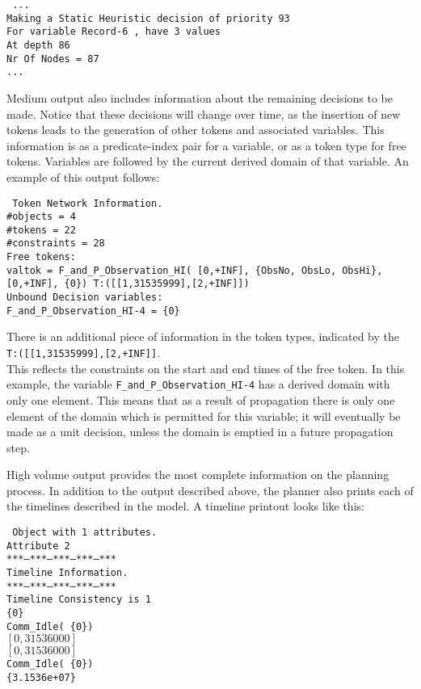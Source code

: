 {\tt
\noindent... \\
Making a Static Heuristic decision of priority 93\\
For variable Record-6 , have 3 values\\
At depth 86\\
Nr Of Nodes = 87\\
...}

Medium output also includes information about the remaining decisions to be made.
Notice that these decisions will change over time, as the insertion of new tokens
leads to the generation of other tokens and associated variables.  This information
is as a predicate-index pair for a variable, or as a token type for free
tokens.  Variables are followed by the current derived domain of that variable.
An example of this output follows:

{\tt
\noindent
Token Network Information.\\
  \#objects = 4\\
  \#tokens =  22\\
  \#constraints = 28\\
Free tokens:\\
valtok = F\_and\_P\_Observation\_HI( [0,+INF], \{ObsNo, ObsLo, ObsHi\}, [0,+INF], \{0\})  
T:([[1,31535999],[2,+INF]])\\
Unbound Decision variables:\\
F\_and\_P\_Observation\_HI-4 = \{0\}\\
}

There is an additional piece of information in the token types, indicated by the\\
{\tt T:([[1,31535999],[2,+INF]]}.\\
\noindent  This reflects the constraints on the start
and end times of the free token.
In this example, the variable {\tt F\_and\_P\_Observation\_HI-4} has a derived domain
with only one element.  This means that as a result of propagation there is only one
element of the domain which is permitted for this variable; it will eventually be made
as a unit decision, unless the domain is emptied in a future propagation step.

High volume output provides the most complete information on the planning process.
In addition to the output described above, the planner also prints each of the timelines
described in the model.  A timeline printout looks like this:

{\tt
\noindent
Object with 1 attributes.\\
Attribute 2\\
***---***---***---***---***\\
Timeline Information.\\
***---***---***---***---***\\
Timeline Consistency is 1\\
\{0\}\\
Comm\_Idle( \{0\})\\
$[0,31536000]$\\
$[0,31536000]$\\
Comm\_Idle( \{0\})\\
\{3.1536e+07\}\\
}

